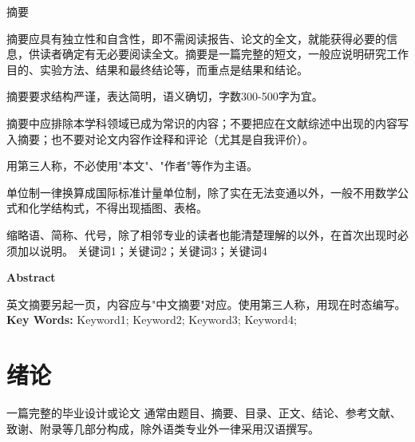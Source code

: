 \documentclass[
	StudentName     = 姓名,
	StudentID       = 学号,
	AdvisorName     = 指导教师,
	Grade           = 年级,
	Major           = 专业,
	Department      = 一个很长很长的名字,
	SubmitYear		= 2022,
	SubmitMonth		= 5,
	Title           = 论文中文题目,
	TitleEng        = {{English Title}}
]{cauc_thesis}
\newcommand{\inputpage}[1]{
	
}
\begin{document}
	\inputpage{cover}
	
	\newpage
	\setcounter{page}{1}
	\setlength{\headsep}{1.224cm}
	\begin{center}
		\fakehei 摘\quad 要
	\end{center}
	\vspace{21pt}
	
	
	\setlength{\baselineskip}{20pt}
	摘要应具有独立性和自含性，即不需阅读报告、论文的全文，就能获得必要的信息，供读者确定有无必要阅读全文。摘要是一篇完整的短文，一般应说明研究工作目的、实验方法、结果和最终结论等，而重点是结果和结论。
	
	摘要要求结构严谨，表达简明，语义确切，字数300-500字为宜。
	
	摘要中应排除本学科领域已成为常识的内容；不要把应在文献综述中出现的内容写入摘要；也不要对论文内容作诠释和评论（尤其是自我评价）。
	
	用第三人称，不必使用"本文"、"作者"等作为主语。
	
	单位制一律换算成国际标准计量单位制，除了实在无法变通以外，一般不用数学公式和化学结构式，不得出现插图、表格。
	
	缩略语、简称、代号，除了相邻专业的读者也能清楚理解的以外，在首次出现时必须加以说明。
	\newline
	\newline
	\indent{} 关键词1；关键词2；关键词3；关键词4

	\newpage
	\setlength{\headsep}{1.224cm}
	\begin{center}
		 \textbf{Abstract} 
	\end{center}
	\vspace{21pt}
	英文摘要另起一页，内容应与"中文摘要"对应。使用第三人称，用现在时态编写。
	\newline
	\newline
	\indent{}\textbf{Key Words: }\songti Keyword1; Keyword2; Keyword3; Keyword4;
	
	\newpage
	\setlength{\headsep}{-0.3cm}
	\tableofcontents
	\clearpage	%
	\setcounter{page}{1}

	
	\setlength{\headsep}{0.624cm}
	\pagestyle{fancy}
	\setlength{\baselineskip}{20pt}
	{\centering\chapter{绪论}}
	\setlength{\baselineskip}{20pt}
	一篇完整的毕业设计或论文 \cite{reflabel1,reflabel2} 通常由题目、摘要、目录、正文、结论、参考文献、致谢、附录等几部分构成，除外语类专业外一律采用汉语撰写。
	
\end{document}
